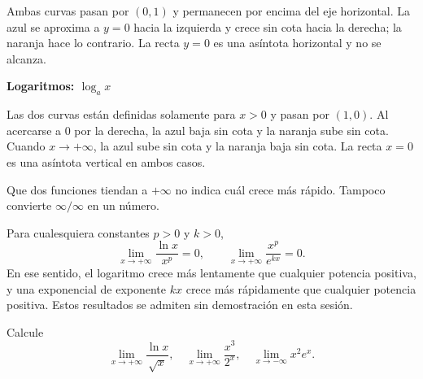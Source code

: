\documentclass[10pt,a5paper]{article}
\newif\ifmostrarSoluciones
\begin{document}
Ambas curvas pasan por $(0,1)$ y permanecen por encima del eje horizontal. La azul se aproxima a $y=0$ hacia la izquierda y crece sin cota hacia la derecha; la naranja hace lo contrario. La recta $y=0$ es una asíntota horizontal y no se alcanza.

\begin{center}
\textbf{Logaritmos: $\log_a x$}\\[2mm]
\end{center}

Las dos curvas están definidas solamente para $x>0$ y pasan por $(1,0)$. Al acercarse a $0$ por la derecha, la azul baja sin cota y la naranja sube sin cota. Cuando $x\to+\infty$, la azul sube sin cota y la naranja baja sin cota. La recta $x=0$ es una asíntota vertical en ambos casos.

Que dos funciones tiendan a $+\infty$ no indica cuál crece más rápido. Tampoco convierte $\infty/\infty$ en un número.

\begin{proposicion}
Para cualesquiera constantes $p>0$ y $k>0$,
\[
  \lim_{x\to+\infty}\frac{\ln x}{x^p}=0,
  \qquad
  \lim_{x\to+\infty}\frac{x^p}{e^{kx}}=0.
\]
En ese sentido, el logaritmo crece más lentamente que cualquier potencia positiva, y una exponencial de exponente $kx$ crece más rápidamente que cualquier potencia positiva. Estos resultados se admiten sin demostración en esta sesión.
\end{proposicion}

\begin{ejemplo}
Calcule
\[
  \lim_{x\to+\infty}\frac{\ln x}{\sqrt{x}},\quad
  \lim_{x\to+\infty}\frac{x^3}{2^x},\quad
  \lim_{x\to-\infty}x^2e^x.
\]
\end{ejemplo}
\ifmostrarSoluciones
\begin{solucion}
El primer límite es $0$ por comparación con la potencia $p=1/2$. En el segundo, $2^x=e^{x\ln2}$ con $\ln2>0$; la comparación con $p=3$ da también $0$. Para el tercero, $t=-x\to+\infty$ y $x^2e^x=t^2/e^t\to0$. Los tres límites son $0$, pero el último exige cambiar el extremo de aproximación.
\end{solucion}
\else\vspace{22mm}\fi
\end{document}
